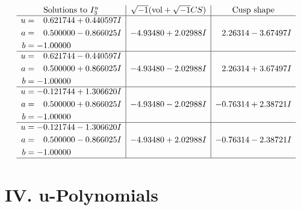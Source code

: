 \documentclass[1p]{elsarticle_modified}
\theoremstyle{definition}
\newcommand{\I}{\sqrt{-1}}
\begin{document}
$$\begin{array}{c|c|c}  
\text{Solutions to }I^u_{3}& \I (\text{vol} + \sqrt{-1}CS) & \text{Cusp shape}\\
 \hline 
\begin{aligned}
u &= \phantom{-}0.621744 + 0.440597 I \\
a &= \phantom{-}0.500000 - 0.866025 I \\
b &= -1.00000\phantom{ +0.000000I}\end{aligned}
 & -4.93480 + 2.02988 I & \phantom{-}2.26314 - 3.67497 I \\ \hline\begin{aligned}
u &= \phantom{-}0.621744 - 0.440597 I \\
a &= \phantom{-}0.500000 + 0.866025 I \\
b &= -1.00000\phantom{ +0.000000I}\end{aligned}
 & -4.93480 - 2.02988 I & \phantom{-}2.26314 + 3.67497 I \\ \hline\begin{aligned}
u &= -0.121744 + 1.306620 I \\
a &= \phantom{-}0.500000 + 0.866025 I \\
b &= -1.00000\phantom{ +0.000000I}\end{aligned}
 & -4.93480 - 2.02988 I & -0.76314 + 2.38721 I \\ \hline\begin{aligned}
u &= -0.121744 - 1.306620 I \\
a &= \phantom{-}0.500000 - 0.866025 I \\
b &= -1.00000\phantom{ +0.000000I}\end{aligned}
 & -4.93480 + 2.02988 I & -0.76314 - 2.38721 I\\
 \hline 
 \end{array}$$\newpage
\newpage\renewcommand{\arraystretch}{1}
\centering \section*{ IV. u-Polynomials}
\end{document}
